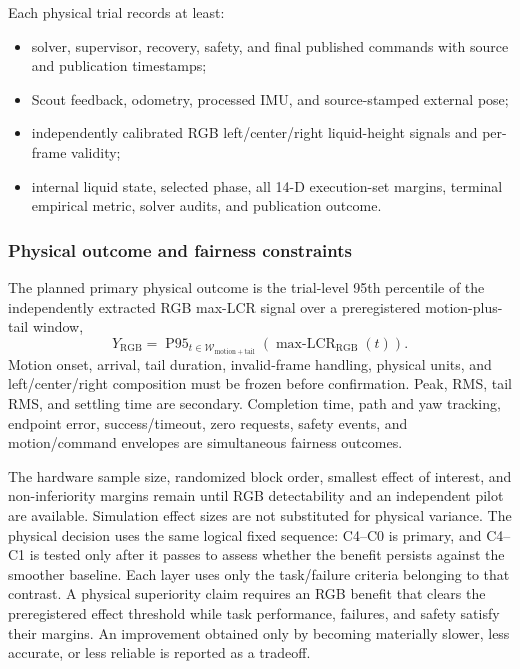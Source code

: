 Each physical trial records at least:
\begin{itemize}
  \item solver, supervisor, recovery, safety, and final published commands with
    source and publication timestamps;
  \item Scout feedback, odometry, processed IMU, and source-stamped external
    pose;
  \item independently calibrated RGB left/center/right liquid-height signals
    and per-frame validity;
  \item internal liquid state, selected phase, all 14-D execution-set margins,
    terminal empirical metric, solver audits, and publication outcome.
\end{itemize}

\subsubsection{Physical outcome and fairness constraints}

The planned primary physical outcome is the trial-level 95th percentile of
the independently extracted RGB max-LCR signal over a preregistered
motion-plus-tail window,
\begin{equation}
  Y_{\mathrm{RGB}}
  =\operatorname{P95}_{t\in\mathcal W_{\mathrm{motion+tail}}}
  \left(\operatorname{max\text{-}LCR}_{\mathrm{RGB}}(t)\right).
  \label{eq:primary_rgb_outcome}
\end{equation}
Motion onset, arrival, tail duration, invalid-frame handling, physical units,
and left/center/right composition must be frozen before confirmation.  Peak,
RMS, tail RMS, and settling time are secondary.  Completion time, path and yaw
tracking, endpoint error, success/timeout, zero requests, safety events, and
motion/command envelopes are simultaneous fairness outcomes.

The hardware sample size, randomized block order, smallest effect of interest,
and non-inferiority margins remain \Pending{} until RGB detectability and an
independent pilot are available.  Simulation effect sizes are not substituted
for physical variance.  The physical decision uses the same logical fixed
sequence: C4--C0 is primary, and C4--C1 is tested only after it passes to
assess whether the benefit persists against the smoother baseline. Each layer uses only the task/failure
criteria belonging to that contrast.  A physical superiority claim requires
an RGB benefit that clears the preregistered effect threshold while task
performance, failures, and safety satisfy their margins.  An improvement
obtained only by becoming materially slower, less accurate, or less reliable
is reported as a tradeoff.

